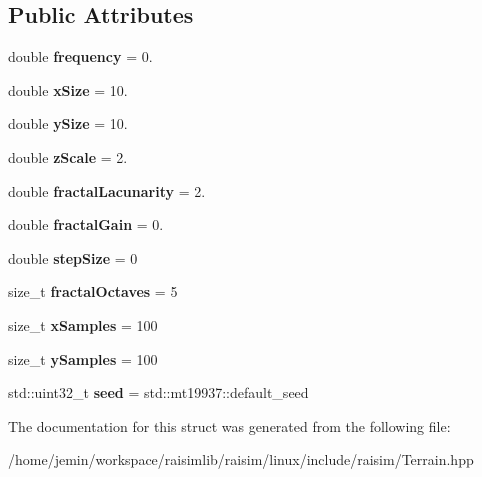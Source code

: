 \subsection*{Public Attributes}
\begin{DoxyCompactItemize}
\item 
\mbox{\label{structraisim_1_1TerrainProperties_ae742acb8605f79ddf6d4cfdbd1e24569}} 
double {\bfseries frequency} = 0.
\item 
\mbox{\label{structraisim_1_1TerrainProperties_affeffc4a91a0e169f21714011c89f90a}} 
double {\bfseries x\+Size} = 10.
\item 
\mbox{\label{structraisim_1_1TerrainProperties_acaae2843eca542cc2247dd824341ff5d}} 
double {\bfseries y\+Size} = 10.
\item 
\mbox{\label{structraisim_1_1TerrainProperties_aa66a9dedcadeff4a92b934a384651df9}} 
double {\bfseries z\+Scale} = 2.
\item 
\mbox{\label{structraisim_1_1TerrainProperties_ac6b68cdfda396d7062757aac8a44f369}} 
double {\bfseries fractal\+Lacunarity} = 2.
\item 
\mbox{\label{structraisim_1_1TerrainProperties_a781312275d3c290eb7b05aafbf16798c}} 
double {\bfseries fractal\+Gain} = 0.
\item 
\mbox{\label{structraisim_1_1TerrainProperties_aaaa81f66e28f9a934941852907c1d53f}} 
double {\bfseries step\+Size} = 0
\item 
\mbox{\label{structraisim_1_1TerrainProperties_ace9ea0f7528147651ed09428b86fd5dd}} 
size\+\_\+t {\bfseries fractal\+Octaves} = 5
\item 
\mbox{\label{structraisim_1_1TerrainProperties_ae1d9f00d373ccbf479b01ad16c8afceb}} 
size\+\_\+t {\bfseries x\+Samples} = 100
\item 
\mbox{\label{structraisim_1_1TerrainProperties_ae2e691bc3d9e898e343e888031381d75}} 
size\+\_\+t {\bfseries y\+Samples} = 100
\item 
\mbox{\label{structraisim_1_1TerrainProperties_a2cbcd03e219b8ee51fbd8155490c7ecc}} 
std\+::uint32\+\_\+t {\bfseries seed} = std\+::mt19937\+::default\+\_\+seed
\end{DoxyCompactItemize}


The documentation for this struct was generated from the following file\+:\begin{DoxyCompactItemize}
\item 
/home/jemin/workspace/raisimlib/raisim/linux/include/raisim/Terrain.\+hpp\end{DoxyCompactItemize}
